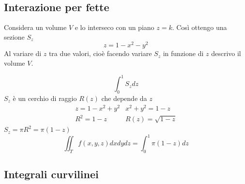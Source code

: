 \subsection{Interazione per fette}
Considera un volume $V$ e lo interseco con un piano $z=k$. Così ottengo una
sezione $S_z$
\begin{equation*}
	z=1-x^2-y^2
\end{equation*}
Al variare di $z$ tra due valori, cioè facendo variare $S_z$ in funzione di $z$
descrivo il volume $V$.
\begin{esempio}
	\begin{equation*}
		\int_{0}^{1} S_zdz
	\end{equation*}
	$S_z$ è un cerchio di raggio $R(z)$ che depende da $z$
	\begin{equation*}
		\begin{matrix}
			z=1-x^2+y^2 & x^2+y^2=1-z\\
			R^2=1-z & R(z)=\sqrt{1-z}
		\end{matrix}
	\end{equation*}
	$S_z=\pi R^2=\pi(1-z)$
	\begin{equation*}
		\iint_T f(x,y,z)dxdydz=\int_0^1\pi(1-z)dz
	\end{equation*}
\end{esempio}
\subsection{Integrali curvilinei}
